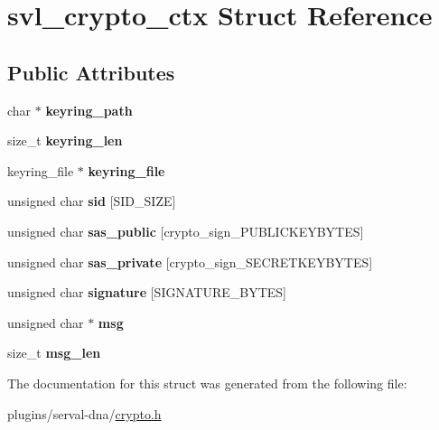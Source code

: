 \hypertarget{structsvl__crypto__ctx}{\section{svl\+\_\+crypto\+\_\+ctx Struct Reference}
\label{structsvl__crypto__ctx}
}
\subsection*{Public Attributes}
\begin{DoxyCompactItemize}
\item 
\hypertarget{structsvl__crypto__ctx_ad8980dd54ef8e577c38f1840a1a1460c}{char $\ast$ {\bfseries keyring\+\_\+path}}\label{structsvl__crypto__ctx_ad8980dd54ef8e577c38f1840a1a1460c}

\item 
\hypertarget{structsvl__crypto__ctx_a5a6d4a9d6a466047528b6c4fb9d408e1}{size\+\_\+t {\bfseries keyring\+\_\+len}}\label{structsvl__crypto__ctx_a5a6d4a9d6a466047528b6c4fb9d408e1}

\item 
\hypertarget{structsvl__crypto__ctx_a7ab514ea2330d07c03e9dd18924b5d3b}{keyring\+\_\+file $\ast$ {\bfseries keyring\+\_\+file}}\label{structsvl__crypto__ctx_a7ab514ea2330d07c03e9dd18924b5d3b}

\item 
\hypertarget{structsvl__crypto__ctx_a56a6ffa4afdbce4b218637cb1e554660}{unsigned char {\bfseries sid} \mbox{[}S\+I\+D\+\_\+\+S\+I\+Z\+E\mbox{]}}\label{structsvl__crypto__ctx_a56a6ffa4afdbce4b218637cb1e554660}

\item 
\hypertarget{structsvl__crypto__ctx_aa073486cf89574d65ef3c0660b3ec9c0}{unsigned char {\bfseries sas\+\_\+public} \mbox{[}crypto\+\_\+sign\+\_\+\+P\+U\+B\+L\+I\+C\+K\+E\+Y\+B\+Y\+T\+E\+S\mbox{]}}\label{structsvl__crypto__ctx_aa073486cf89574d65ef3c0660b3ec9c0}

\item 
\hypertarget{structsvl__crypto__ctx_a3f476ccc11a0c28552877358e6f64d30}{unsigned char {\bfseries sas\+\_\+private} \mbox{[}crypto\+\_\+sign\+\_\+\+S\+E\+C\+R\+E\+T\+K\+E\+Y\+B\+Y\+T\+E\+S\mbox{]}}\label{structsvl__crypto__ctx_a3f476ccc11a0c28552877358e6f64d30}

\item 
\hypertarget{structsvl__crypto__ctx_aa5a5a1490bff146660c77951fc0e2e98}{unsigned char {\bfseries signature} \mbox{[}S\+I\+G\+N\+A\+T\+U\+R\+E\+\_\+\+B\+Y\+T\+E\+S\mbox{]}}\label{structsvl__crypto__ctx_aa5a5a1490bff146660c77951fc0e2e98}

\item 
\hypertarget{structsvl__crypto__ctx_aa3e2e9b87b39af964921175ede10c7e4}{unsigned char $\ast$ {\bfseries msg}}\label{structsvl__crypto__ctx_aa3e2e9b87b39af964921175ede10c7e4}

\item 
\hypertarget{structsvl__crypto__ctx_ab2897ce3e55a5dbd3c13db58cfa4e374}{size\+\_\+t {\bfseries msg\+\_\+len}}\label{structsvl__crypto__ctx_ab2897ce3e55a5dbd3c13db58cfa4e374}

\end{DoxyCompactItemize}


The documentation for this struct was generated from the following file\+:\begin{DoxyCompactItemize}
\item 
plugins/serval-\/dna/\hyperlink{crypto_8h}{crypto.\+h}\end{DoxyCompactItemize}
